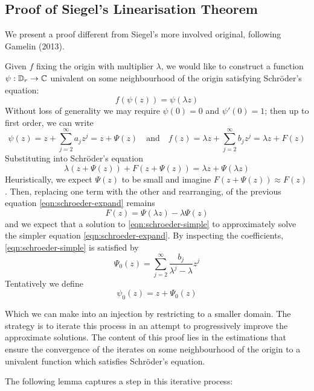 \documentclass[../main.tex]{subfiles}
\begin{document}
\newcommand\tmpsi{\bar{\psi}}

\subsection{Proof of Siegel's Linearisation Theorem}

We present a proof different from Siegel's more involved original, following Gamelin (2013).

Given $f$ fixing the origin with multiplier $\lambda$, we would like to construct a function $\psi : \mathbb{D}_r \to \mathbb{C}$ univalent on some neighbourhood of the origin satisfying Schröder's equation:
\[
f(\psi(z)) = \psi(\lambda z)
\]
Without loss of generality we may require $\psi(0) = 0$ and $\psi'(0) = 1$; then up to first order, we can write
\[
\psi(z) = z + \sum_{j=2}^\infty a_jz^j = z + \Psi(z)
\quad\text{and}\quad
f(z) = \lambda z + \sum_{j=2}^\infty b_j z^j = \lambda z + F(z)
\]
Substituting into Schröder's equation
\begin{equation}\label{eqn:schroeder-expand}
    \lambda(z + \Psi(z)) + F(z + \Psi(z)) = \lambda z + \Psi(\lambda z)
\end{equation}
Heuristically, we expect $\Psi(z)$ to be small and imagine $F(z + \Psi(z)) \approx F(z)$. Then, replacing one term with the other and rearranging, of the previous equation \eqref{eqn:schroeder-expand} remains
\begin{equation}\label{eqn:schroeder-simple}
     F(z) = \Psi(\lambda z) - \lambda\Psi(z)
\end{equation}
and we expect that a solution to \eqref{eqn:schroeder-simple} to approximately solve the simpler equation  \eqref{eqn:schroeder-expand}. By inspecting the coefficients, \eqref{eqn:schroeder-simple} is satisfied by
\begin{equation*}
    \Psi_0(z) = \sum_{j=2}^\infty \frac{b_j}{\lambda^j - \lambda}z^j
\end{equation*}
Tentatively we define
\begin{equation}
    \psi_0(z) = z + \Psi_0(z)
\end{equation}

Which we can make into an injection by restricting to a smaller domain. The strategy is to iterate this process in an attempt to progressively improve the approximate solutions. The content of this proof lies in the estimations that ensure the convergence of the iterates on some neighbourhood of the origin to a univalent function which satisfies Schröder's equation.

The following lemma captures a step in this iterative process:
\end{document}
